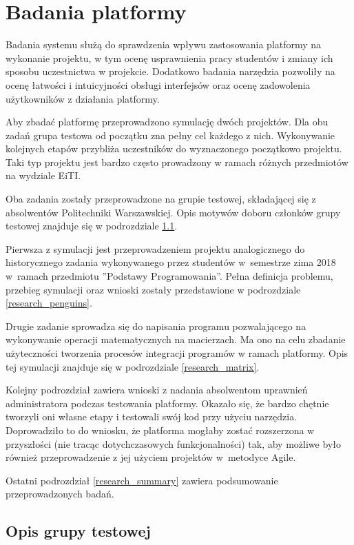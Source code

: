 \chapter{Badania platformy}
\label{chapter:research}

Badania systemu służą do sprawdzenia wpływu zastosowania platformy na wykonanie projektu, w tym ocenę usprawnienia pracy studentów i zmiany ich sposobu uczestnictwa w projekcie.
Dodatkowo badania narzędzia pozwoliły na ocenę łatwości i intuicyjności obsługi interfejsów oraz ocenę zadowolenia użytkowników z działania platformy.

Aby zbadać platformę przeprowadzono symulację dwóch projektów.
Dla obu zadań grupa testowa od początku zna pełny cel każdego z nich.
Wykonywanie kolejnych etapów przybliża uczestników do wyznaczonego początkowo projektu.
Taki typ projektu jest bardzo często prowadzony w ramach różnych przedmiotów na wydziale EiTI.

Oba zadania zostały przeprowadzone na grupie testowej, składającej się z absolwentów Politechniki Warszawskiej.
Opis motywów doboru członków grupy testowej znajduje się w podrozdziale \ref{research_group}.

Pierwsza z symulacji jest przeprowadzeniem projektu analogicznego do historycznego zadania wykonywanego przez studentów w~semestrze zima 2018 w~ramach przedmiotu ”Podstawy Programowania”.
Pełna definicja problemu, przebieg symulacji oraz wnioski zostały przedstawione w podrozdziale \ref{research_penguins}.

Drugie zadanie sprowadza się do napisania programu pozwalającego na wykonywanie operacji matematycznych na macierzach.
Ma ono na celu zbadanie użyteczności tworzenia procesów integracji programów w ramach platformy.
Opis tej symulacji znajduje się w podrozdziale \ref{research_matrix}.

Kolejny podrozdział zawiera wnioski z nadania absolwentom uprawnień administratora podczas testowania platformy.
Okazało się, że bardzo chętnie tworzyli oni własne etapy i testowali swój kod przy użyciu narzędzia.
Doprowadziło to do wniosku, że platforma mogłaby zostać rozszerzona w przyszłości (nie tracąc dotychczasowych funkcjonalności) tak, aby możliwe było również przeprowadzenie z jej użyciem projektów w~metodyce Agile.

Ostatni podrozdział \ref{research_summary} zawiera podsumowanie przeprowadzonych badań.


\section{Opis grupy testowej}
\label{research_group}

